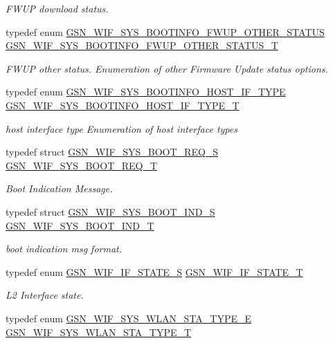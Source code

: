 \begin{DoxyCompactItemize}
\begin{DoxyCompactList}\small\item\em FWUP download status. \end{DoxyCompactList}\item 
typedef enum \hyperlink{a00639_ga8df4566faa9edce0748124e2d08c1efe}{GSN\_\-WIF\_\-SYS\_\-BOOTINFO\_\-FWUP\_\-OTHER\_\-STATUS} \hyperlink{a00639_ga48fd5cab26a503fd58913132ff62487b}{GSN\_\-WIF\_\-SYS\_\-BOOTINFO\_\-FWUP\_\-OTHER\_\-STATUS\_\-T}
\begin{DoxyCompactList}\small\item\em FWUP other status. Enumeration of other Firmware Update status options. \end{DoxyCompactList}\item 
typedef enum \hyperlink{a00639_gaa1aae8d2007a2f4b746672dbc9c8efbb}{GSN\_\-WIF\_\-SYS\_\-BOOTINFO\_\-HOST\_\-IF\_\-TYPE} \hyperlink{a00639_gaa8a4795d26e385102aa6e91b2a088c6d}{GSN\_\-WIF\_\-SYS\_\-BOOTINFO\_\-HOST\_\-IF\_\-TYPE\_\-T}
\begin{DoxyCompactList}\small\item\em host interface type Enumeration of host interface types \end{DoxyCompactList}\item 
typedef struct \hyperlink{a00348}{GSN\_\-WIF\_\-SYS\_\-BOOT\_\-REQ\_\-S} \hyperlink{a00639_ga1d3de3e01c42d56351a808bbea56786d}{GSN\_\-WIF\_\-SYS\_\-BOOT\_\-REQ\_\-T}
\begin{DoxyCompactList}\small\item\em Boot Indication Message. \end{DoxyCompactList}\item 
typedef struct \hyperlink{a00347}{GSN\_\-WIF\_\-SYS\_\-BOOT\_\-IND\_\-S} \hyperlink{a00639_gad38929b3e09d60d08210d2b83a89b43f}{GSN\_\-WIF\_\-SYS\_\-BOOT\_\-IND\_\-T}
\begin{DoxyCompactList}\small\item\em boot indication msg format. \end{DoxyCompactList}\item 
typedef enum \hyperlink{a00639_ga5b5ea6b444509449484db8bf22612b98}{GSN\_\-WIF\_\-IF\_\-STATE\_\-S} \hyperlink{a00639_ga7ff7134a0bdba9e91d4edf9cea797de7}{GSN\_\-WIF\_\-IF\_\-STATE\_\-T}
\begin{DoxyCompactList}\small\item\em L2 Interface state. \end{DoxyCompactList}\item 
typedef enum \hyperlink{a00612_a130509bc0cea8325a8be3adb5d7f4bd8}{GSN\_\-WIF\_\-SYS\_\-WLAN\_\-STA\_\-TYPE\_\-E} \hyperlink{a00612_a95a21392fdd498964fccb4f7c1d161ac}{GSN\_\-WIF\_\-SYS\_\-WLAN\_\-STA\_\-TYPE\_\-T}

\end{DoxyCompactItemize}
